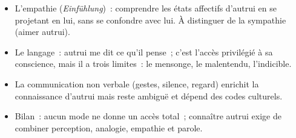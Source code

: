 \documentclass[11pt]{article}
\newcommand{\cle}[1]{{\popxbold\color{popdark}#1}}
\begin{document}
\begin{aretenir}
\begin{itemize}
\item L'\cle{empathie} (\emph{Einf\"uhlung})~: comprendre les \'etats affectifs d'autrui en se projetant en lui, sans se confondre avec lui. \`A distinguer de la sympathie (aimer autrui).
\item Le \cle{langage}~: autrui me dit ce qu'il pense~; c'est l'acc\`es privil\'egi\'e \`a sa conscience, mais il a trois limites~: le mensonge, le malentendu, l'indicible.
\item La \cle{communication non verbale} (gestes, silence, regard) enrichit la connaissance d'autrui mais reste ambigu\"e et d\'epend des codes culturels.
\item Bilan~: aucun mode ne donne un acc\`es total~; conna\^itre autrui exige de combiner perception, analogie, empathie et parole.
\end{itemize}
\end{aretenir}
\end{document}
